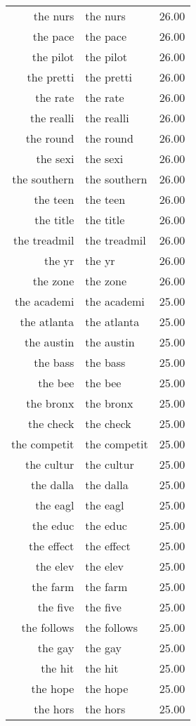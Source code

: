 \begin{table}[ht]
\begin{tabular}{rlr}
  the nurs & the nurs & 26.00 \\ 
  the pace & the pace & 26.00 \\ 
  the pilot & the pilot & 26.00 \\ 
  the pretti & the pretti & 26.00 \\ 
  the rate & the rate & 26.00 \\ 
  the realli & the realli & 26.00 \\ 
  the round & the round & 26.00 \\ 
  the sexi & the sexi & 26.00 \\ 
  the southern & the southern & 26.00 \\ 
  the teen & the teen & 26.00 \\ 
  the title & the title & 26.00 \\ 
  the treadmil & the treadmil & 26.00 \\ 
  the yr & the yr & 26.00 \\ 
  the zone & the zone & 26.00 \\ 
  the academi & the academi & 25.00 \\ 
  the atlanta & the atlanta & 25.00 \\ 
  the austin & the austin & 25.00 \\ 
  the bass & the bass & 25.00 \\ 
  the bee & the bee & 25.00 \\ 
  the bronx & the bronx & 25.00 \\ 
  the check & the check & 25.00 \\ 
  the competit & the competit & 25.00 \\ 
  the cultur & the cultur & 25.00 \\ 
  the dalla & the dalla & 25.00 \\ 
  the eagl & the eagl & 25.00 \\ 
  the educ & the educ & 25.00 \\ 
  the effect & the effect & 25.00 \\ 
  the elev & the elev & 25.00 \\ 
  the farm & the farm & 25.00 \\ 
  the five & the five & 25.00 \\ 
  the follows & the follows & 25.00 \\ 
  the gay & the gay & 25.00 \\ 
  the hit & the hit & 25.00 \\ 
  the hope & the hope & 25.00 \\ 
  the hors & the hors & 25.00 \\ 

\end{tabular}
\end{table}
